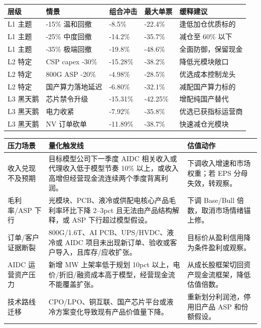 \begin{exhibitbox}
\begin{tabularx}{\textwidth}{L{1.5cm} L{3.0cm} R{1.5cm} R{1.8cm} L{3.5cm}}
\toprule
\textbf{层级} & \textbf{情景} & \textbf{组合冲击} & \textbf{最大单票} & \textbf{缓释建议}\\
\midrule
L1 主题 & -15\% 温和回撤 & -8.5\% & -22.4\% & 逢低加仓优质标的\\
L1 主题 & -25\% 中度回撤 & -14.2\% & -35.7\% & 减仓至 60\% 以下\\
L1 主题 & -35\% 极端回撤 & -19.8\% & -48.6\% & 全面防御，保留现金\\
L2 特定 & CSP capex -30\% & -15.28\% & -38.2\% & 降低光模块敞口\\
L2 特定 & 800G ASP -20\% & -4.98\% & -28.5\% & 优选成本控制龙头\\
L2 特定 & 国产算力落地延迟 & -6.80\% & -32.1\% & 减配国产算力标的\\
L3 黑天鹅 & 芯片禁令升级 & -15.31\% & -42.25\% & 增配纯国产替代\\
L3 黑天鹅 & 电力收紧 & -7.92\% & -35.8\% & 优选已获指标运营商\\
L3 黑天鹅 & NV 订单砍单 & -11.89\% & -38.7\% & 快速减仓光模块\\
\bottomrule
\end{tabularx}
\end{exhibitbox}

\begin{exhibitbox}
\begin{tabularx}{\textwidth}{L{2.6cm}X X}
\toprule
\textbf{压力场景} & \textbf{量化触发线} & \textbf{估值动作}\\
\midrule
收入兑现不及预期 & 目标模型公司下一季度 AIDC 相关收入或代理收入低于模型节奏 10\% 以上，或收入高增但经营现金流连续两个季度背离利润。 & 下调收入增速和市场权重；若 EPS 分母失效，转观察。\\
毛利率/ASP 下行 & 光模块、PCB、液冷或供配电核心产品毛利率环比下降 2--3pct 且无法由产品结构解释，或 ASP 下行超过模型假设。 & 下调 Base/Bull 倍数，取消市场情绪锚上修。\\
订单/客户证据断裂 & 800G/1.6T、AI PCB、UPS/HVDC、液冷或 AIDC 项目未出现新订单、验收或客户导入，且库存/应收扩张。 & 目标价从盈利信用降为条件盈利或观察。\\
AIDC 运营资产压力 & 新增 MW 上架率低于规划 10pct 以上，电价/折旧/融资成本高于模型，经营现金流不能覆盖扩张。 & 从成长股框架切回资产现金流框架，降低估值倍数。\\
技术路线迁移 & CPO/LPO、铜互联、国产芯片平台或液冷方案变化导致现有产品价值量下降。 & 重新划分利润池，停用旧产品 ASP 和份额假设。\\
\bottomrule
\end{tabularx}
\end{exhibitbox}


